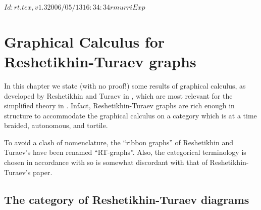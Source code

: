 \RCSID $Id: rt.tex,v 1.3 2006/05/13 16:34:34 rmurri Exp $


\chapter{Graphical Calculus for Reshetikhin-Turaev graphs}
\label{cha:rt}

In this chapter we state (with no proof!) some results of graphical
calculus, as developed by Reshetikhin and Turaev in
\cite{reshetikhin-turaev;ribbon-graphs}, which are most relevant for
the simplified theory in . Infact, Reshetikhin-Turaev
graphs are rich enough in structure to accommodate the graphical
calculus on a category which is at a time braided, autonomous, and
tortile.

To avoid a clash of nomenclature, the ``ribbon graphs'' of Reshetikhin
and Turaev's \cite{reshetikhin-turaev;ribbon-graphs} have been renamed
``RT-graphs''. Also, the categorical terminology is chosen in
accordance with  so is somewhat discordant with that of
Reshetikhin-Turaev's paper.

\section{The category of Reshetikhin-Turaev diagrams} 
\label{sec:rt-diagrams}


